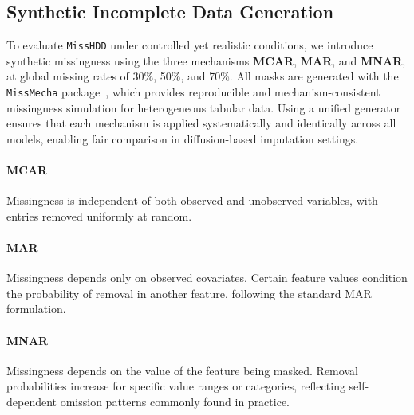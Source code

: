 \documentclass[times, review, 10pt]{elsarticle}
\begin{document}
\subsection{Synthetic Incomplete Data Generation}

To evaluate \texttt{MissHDD} under controlled yet realistic conditions, we
introduce synthetic missingness using the three mechanisms
\textbf{MCAR}, \textbf{MAR}, and \textbf{MNAR}, at global missing rates of
30\%, 50\%, and 70\%. All masks are generated with the
\texttt{MissMecha} package~\cite{missmecha}, which provides reproducible and
mechanism-consistent missingness simulation for heterogeneous tabular data.
Using a unified generator ensures that each mechanism is applied
systematically and identically across all models, enabling fair comparison in
diffusion-based imputation settings.

\paragraph*{MCAR}
Missingness is independent of both observed and unobserved variables, with
entries removed uniformly at random.

\paragraph*{MAR}
Missingness depends only on observed covariates. Certain feature values
condition the probability of removal in another feature, following the
standard MAR formulation.

\paragraph*{MNAR}
Missingness depends on the value of the feature being masked. Removal
probabilities increase for specific value ranges or categories, reflecting
self-dependent omission patterns commonly found in practice.
\end{document}
